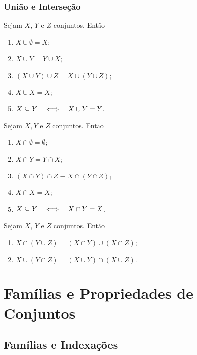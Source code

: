 \subsection*{União e Interseção}

\begin{prop}
Sejam $X$, $Y$ e $Z$ conjuntos. Então
	\begin{enumerate}
	\item $X \cup \emptyset = X$;
	\item $X \cup Y = Y \cup X$;
	\item $(X \cup Y) \cup Z = X \cup (Y \cup Z)$;
	\item $X \cup X = X$;
	\item $X \subseteq Y \quad \Longleftrightarrow \quad X \cup Y = Y$.
	\end{enumerate}
\end{prop}

\begin{prop}
Sejam $X,Y$ e $Z$ conjuntos. Então
	\begin{enumerate}
	\item $X \cap \emptyset = \emptyset$;
	\item $X \cap Y = Y \cap X$;
	\item $(X \cap Y) \cap Z = X \cap (Y \cap Z)$;
	\item $X \cap X = X$;
	\item $X \subseteq Y \quad \Longleftrightarrow \quad X \cap Y = X$.
	\end{enumerate}
\end{prop}

\begin{prop}
Sejam $X$, $Y$ e $Z$ conjuntos. Então
	\begin{enumerate}
	\item $X \cap (Y \cup Z) = (X \cap Y) \cup (X \cap Z)$;
	\item $X \cup (Y \cap Z) = (X \cup Y) \cap (X \cup Z)$.
	\end{enumerate}
\end{prop}

\chapter{Famílias e Propriedades de Conjuntos}

\section{Famílias e Indexações}

